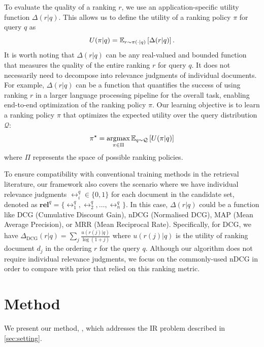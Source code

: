 \documentclass{article}
\begin{document}
To evaluate the quality of a ranking $r$, we use an application-specific utility function $\Delta(r|q)$. This allows us to define the utility of a ranking policy $\pi$ for query $q$ as
\begin{equation}
    U(\pi | q) = \mathbb{E}_{r\sim\pi(\cdot | q)}\left[\Delta(r|q)\right].
\end{equation}
It is worth noting that $\Delta(r|q)$ can be any real-valued and bounded function that measures the quality of the entire ranking $r$ for query $q$. It does not necessarily need to decompose into relevance judgments of individual documents. For example, $\Delta(r|q)$ can be a function that quantifies the success of using ranking $r$ in a larger language processing pipeline for the overall task, enabling end-to-end optimization of the ranking policy $\pi$. Our learning objective is to learn a ranking policy $\pi$ that optimizes the expected utility over the query distribution $\mathcal{Q}$:
\begin{equation}
    \pi^{\star} = \operatorname*{argmax}_{\pi\in\Pi}\mathbb{E}_{q\sim\mathcal{Q}}\left[U(\pi | q)\right]
    \label{eq:obj}
\end{equation}
where $\Pi$ represents the space of possible ranking policies.

To ensure compatibility with conventional training methods in the retrieval literature, our framework also covers the scenario where we have individual relevance judgments $\rel^{q}_i\in\{0, 1\}$ for each document in the candidate set, denoted as $\textbf{rel}^{q} = \{\rel^{q}_1, \rel^{q}_2, \ldots, \rel^{q}_n\}$. In this case,  $\Delta(r|q)$ could be a function like DCG (Cumulative Discount Gain), nDCG (Normalised DCG), 
MAP (Mean Average Precision), or MRR (Mean Reciprocal Rate). Specifically, for DCG,  we have $\Delta_{\text{DCG}}(r|q) = \sum_j \frac{u(r(j) | q)}{\log(1+j)}$ where $u(r(j) | q)$ is the utility of ranking document $d_j$ in the ordering $r$ for the query $q$.
Although our algorithm does not require individual relevance judgments, we focus on the commonly-used nDCG in order to compare with prior that relied on this ranking metric. 

\section{Method} \label{sec:method}

We present our method, \alg{}, which addresses the IR problem described in \autoref{sec:setting}.
\end{document}
